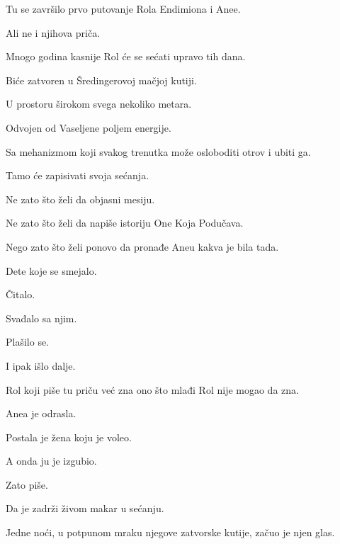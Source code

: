 \bigskip

Tu se završilo prvo putovanje Rola Endimiona i Anee.

\bigskip

Ali ne i njihova priča.

\bigskip

Mnogo godina kasnije Rol će se sećati upravo tih dana.

\bigskip

Biće zatvoren u Šredingerovoj mačjoj kutiji.

U prostoru širokom svega nekoliko metara.

Odvojen od Vaseljene poljem energije.

\bigskip

Sa mehanizmom koji svakog trenutka može osloboditi otrov i ubiti ga.

\bigskip

Tamo će zapisivati svoja sećanja.

\bigskip

Ne zato što želi da objasni mesiju.

Ne zato što želi da napiše istoriju One Koja Podučava.

\bigskip

Nego zato što želi ponovo da pronađe Aneu kakva je bila tada.

\bigskip

Dete koje se smejalo.

Čitalo.

Svađalo sa njim.

Plašilo se.

I ipak išlo dalje.

\bigskip

Rol koji piše tu priču već zna ono što mlađi Rol nije mogao da zna.

\bigskip

Anea je odrasla.

\bigskip

Postala je žena koju je voleo.

\bigskip

A onda ju je izgubio.

\bigskip

Zato piše.

\bigskip

Da je zadrži živom makar u sećanju.

\bigskip

Jedne noći, u potpunom mraku njegove zatvorske kutije, začuo je njen glas.

\bigskip

